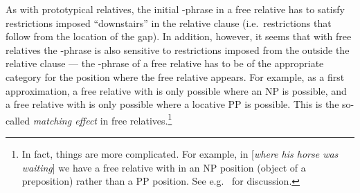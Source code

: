 \documentclass[output=paper,biblatex,babelshorthands,newtxmath,draftmode,colorlinks,citecolor=brown]{langscibook}
\begin{document}
As with prototypical relatives, the initial -phrase in a free relative has to
satisfy restrictions imposed ``downstairs'' in the relative clause (i.e.\ restrictions that
follow from the location of the gap). In addition, however, it seems that with free
relatives the -phrase is also sensitive to restrictions imposed from the
outside the relative clause --- the -phrase of a free relative has to be of the
appropriate category for the position where the free relative appears. For example, as a
first approximation, a free relative with  is only possible where an NP is
possible, and a free relative with  is only possible where a locative PP is
possible. This is the so-called \emph{matching effect} in free relatives.\footnote{In
  fact, things are more complicated. For example, in  [\emph{where his horse
    was waiting}] we have a free relative with  in an NP position (object of a
  preposition) rather than a PP position. See e.g.\  for discussion.}
\end{document}
